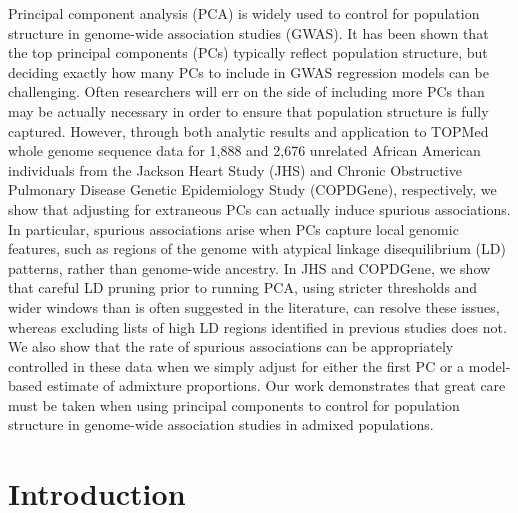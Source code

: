 \documentclass[12pt]{article}
\begin{document}
Principal component analysis (PCA) is widely used to control for population structure in genome-wide association studies (GWAS). It has been shown that the top principal components (PCs) typically reflect population structure, but deciding exactly how many PCs to include in GWAS regression models can be challenging. Often researchers will err on the side of including more PCs than may be actually necessary in order to ensure that population structure is fully captured. However, through both analytic results and application to TOPMed whole genome sequence data for 1,888 and 2,676 unrelated African American individuals from the Jackson Heart Study (JHS) and Chronic Obstructive Pulmonary Disease Genetic Epidemiology Study (COPDGene), respectively, we show that adjusting for extraneous PCs can actually induce spurious associations. In particular, spurious associations arise when PCs capture local genomic features, such as regions of the genome with atypical linkage disequilibrium (LD) patterns, rather than genome-wide ancestry. In JHS and COPDGene, we show that careful LD pruning prior to running PCA, using stricter thresholds and wider windows than is often suggested in the literature, can resolve these issues, whereas excluding lists of high LD regions identified in previous studies does not. We also show that the rate of spurious associations can be appropriately controlled in these data when we simply adjust for either the first PC or a model-based estimate of admixture proportions. Our work demonstrates that great care must be taken when using principal components to control for population structure in genome-wide association studies in admixed populations.


\newpage
\section{Introduction}

\end{document}
